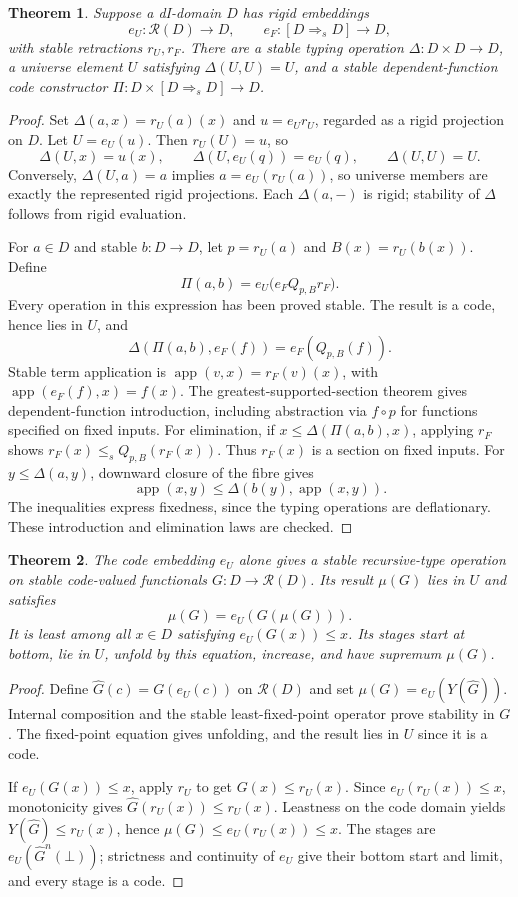 \documentclass[11pt]{article}
\newtheorem{theorem}{Theorem}[section]
\begin{document}
\begin{theorem}
Suppose a dI-domain $D$ has rigid embeddings
\[
 e_U:\mathcal R(D)\longrightarrow D,\qquad
 e_F:[D\Rightarrow_s D]\longrightarrow D,
\]
with stable retractions $r_U,r_F$. There are a stable typing operation
$\Delta:D\times D\to D$, a universe element $U$ satisfying $\Delta(U,U)=U$,
and a stable dependent-function code constructor
$\Pi:D\times[D\Rightarrow_s D]\to D$.
\end{theorem}
\begin{proof}
Set $\Delta(a,x)=r_U(a)(x)$ and $u=e_Ur_U$, regarded as a rigid
projection on $D$. Let $U=e_U(u)$. Then $r_U(U)=u$, so
\[
 \Delta(U,x)=u(x),\qquad
 \Delta(U,e_U(q))=e_U(q),\qquad \Delta(U,U)=U.
\]
Conversely, $\Delta(U,a)=a$ implies $a=e_U(r_U(a))$, so universe members
are exactly the represented rigid projections. Each $\Delta(a,-)$ is
rigid; stability of $\Delta$ follows from rigid evaluation.

For $a\in D$ and stable $b:D\to D$, let $p=r_U(a)$ and
$B(x)=r_U(b(x))$. Define
\[
 \Pi(a,b)=e_U\bigl(e_F Q_{p,B}r_F\bigr).
\]
Every operation in this expression has been proved stable. The result
is a code, hence lies in $U$, and
\[
 \Delta(\Pi(a,b),e_F(f))=e_F(Q_{p,B}(f)).
\]
Stable term application is $\operatorname{app}(v,x)=r_F(v)(x)$, with
$\operatorname{app}(e_F(f),x)=f(x)$.
The greatest-supported-section theorem gives dependent-function
introduction, including abstraction via $f\circ p$ for functions
specified on fixed inputs. For elimination, if
$x\le\Delta(\Pi(a,b),x)$, applying $r_F$ shows
$r_F(x)\le_s Q_{p,B}(r_F(x))$. Thus $r_F(x)$ is a section on fixed inputs.
For $y\le\Delta(a,y)$, downward closure of the fibre gives
\[
 \operatorname{app}(x,y)\le
 \Delta(b(y),\operatorname{app}(x,y)).
\]
The inequalities express fixedness, since the typing operations are
deflationary. These introduction and elimination laws are checked.
\end{proof}

\begin{theorem}
The code embedding $e_U$ alone gives a stable recursive-type operation
on stable code-valued functionals $G:D\to\mathcal R(D)$. Its result
$\mu(G)$ lies in $U$ and satisfies
\[
 \mu(G)=e_U(G(\mu(G))).
\]
It is least among all $x\in D$ satisfying $e_U(G(x))\le x$.
Its stages start at bottom, lie in $U$, unfold by this equation, increase,
and have supremum $\mu(G)$.
\end{theorem}
\begin{proof}
Define $\widehat G(c)=G(e_U(c))$ on $\mathcal R(D)$ and set
$\mu(G)=e_U(Y(\widehat G))$. Internal composition and the stable
least-fixed-point operator prove stability in $G$. The fixed-point
equation gives unfolding, and the result lies in $U$ since it is a code.

If $e_U(G(x))\le x$, apply $r_U$ to get $G(x)\le r_U(x)$.
Since $e_U(r_U(x))\le x$, monotonicity gives
$\widehat G(r_U(x))\le r_U(x)$. Leastness on the code domain yields
$Y(\widehat G)\le r_U(x)$, hence $\mu(G)\le e_U(r_U(x))\le x$.
The stages are $e_U(\widehat G^n(\bot))$; strictness and continuity of
$e_U$ give their bottom start and limit, and every stage is a code.
\end{proof}
\end{document}
